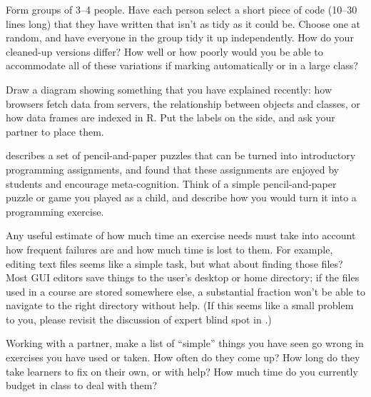 
Form groups of 3--4 people.  Have each person select a short piece of
code (10--30 lines long) that they have written that isn't as tidy as
it could be.  Choose one at random, and have everyone in the group
tidy it up independently.  How do your cleaned-up versions differ?
How well or how poorly would you be able to accommodate all of these
variations if marking automatically or in a large class?


Draw a diagram showing something that you have explained recently: how
browsers fetch data from servers, the relationship between objects and
classes, or how data frames are indexed in R.  Put the labels on the
side, and ask your partner to place them.


\cite{Butl2017} describes a set of pencil-and-paper puzzles that can
be turned into introductory programming assignments, and found that
these assignments are enjoyed by students and encourage
meta-cognition.  Think of a simple pencil-and-paper puzzle or game you
played as a child, and describe how you would turn it into a
programming exercise.


Any useful estimate of how much time an exercise needs must take into
account how frequent failures are and how much time is lost to them.
For example, editing text files seems like a simple task, but what
about finding those files?  Most GUI editors save things to the user's
desktop or home directory; if the files used in a course are stored
somewhere else, a substantial fraction won't be able to navigate to
the right directory without help. (If this seems like a small problem
to you, please revisit the discussion of expert blind spot in
.)

Working with a partner, make a list of ``simple'' things you have seen
go wrong in exercises you have used or taken.  How often do they come
up?  How long do they take learners to fix on their own, or with help?
How much time do you currently budget in class to deal with them?
